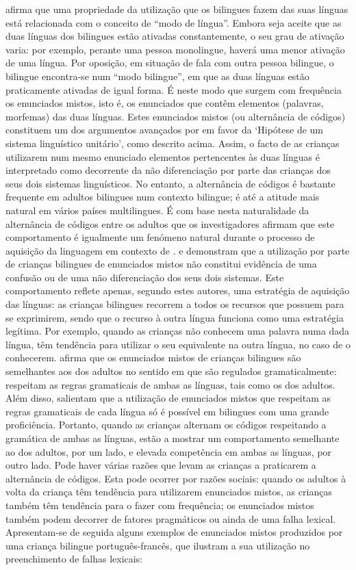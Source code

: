 \documentclass[output=paper]{LSP/langsci}
\begin{document}
\cite{grosjean2004} afirma que uma propriedade da utilização que os bilingues fazem das suas línguas está relacionada com o conceito de ``modo de língua''. Embora seja aceite que as duas línguas dos bilingues estão ativadas constantemente, o seu grau de ativação varia: por exemplo, perante uma pessoa monolingue, haverá uma menor ativação de uma língua. Por oposição, em situação de fala com outra pessoa bilingue, o bilingue encontra-se num ``modo bilingue'', em que as duas línguas estão praticamente ativadas de igual forma. É neste modo que surgem com frequência os enunciados mistos, isto é, os enunciados que contêm elementos (palavras, morfemas) das duas línguas. Estes enunciados mistos (ou alternância de códigos) constituem um dos argumentos avançados por \cite{volterrataeschner1978} em favor da `Hipótese de um sistema linguístico unitário', como descrito acima. Assim, o facto de as crianças utilizarem num mesmo enunciado elementos pertencentes às duas línguas é interpretado como decorrente da não diferenciação por parte das crianças dos seus dois sistemas linguísticos. No entanto, a alternância de códigos é bastante frequente em adultos bilingues num contexto bilingue; é até a atitude mais natural em vários países multilingues. É com base nesta naturalidade da alternância de códigos entre os adultos que os investigadores afirmam que este comportamento é igualmente um fenómeno natural durante o processo de aquisição da linguagem em contexto de . \cite{leisel1989} e \cite{genesee1989} demonstram que a utilização por parte de crianças bilingues de enunciados mistos não constitui evidência de uma confusão ou de uma não diferenciação dos seus dois sistemas. Este comportamento reflete apenas, segundo estes autores, uma estratégia de aquisição das línguas: as crianças bilingues recorrem a todos os recursos que possuem para se exprimirem, sendo que o recurso à outra língua funciona como uma estratégia legítima. Por exemplo, quando as crianças não conhecem uma palavra numa dada língua, têm tendência para utilizar o seu equivalente na outra língua, no caso de o conhecerem. \cite{genesee1989} afirma que os enunciados mistos de crianças bilingues são semelhantes aos dos adultos no sentido em que são regulados gramaticalmente: respeitam as regras gramaticais de ambas as línguas, tais como os dos adultos. Além disso, \cite{genesee_etal2004} salientam que a utilização de enunciados mistos que respeitam as regras gramaticais de cada língua só é possível em bilingues com uma grande proficiência. Portanto, quando as crianças alternam os códigos respeitando a gramática de ambas as línguas, estão a mostrar um comportamento semelhante ao dos adultos, por um lado, e elevada competência em ambas as línguas, por outro lado. Pode haver várias razões que levam as crianças a praticarem a alternância de códigos. Esta pode ocorrer por razões sociais: quando os adultos à volta da criança têm tendência para utilizarem enunciados mistos, as crianças também têm tendência para o fazer com frequência; os enunciados mistos também podem decorrer de fatores pragmáticos ou ainda de uma falha lexical. Apresentam-se de seguida alguns exemplos de enunciados mistos produzidos por uma criança bilingue português-francês, que ilustram a sua utilização no preenchimento de falhas lexicais:
\end{document}
